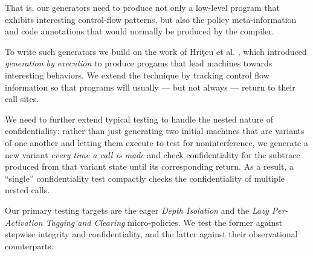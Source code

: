 \documentclass[10pt,conference]{ieeetran}%
\theoremstyle{definition}
\begin{document}
{That is, our generators need to produce not only a low-level program
that exhibits interesting control-flow patterns, but also the policy
meta-information and code annotations that would normally be produced
by the compiler.

To write such generators we build on the work of
Hri\c{t}cu et al. \cite{TestingNI:ICFP, DBLP:journals/jfp/HritcuLSADHPV16}, which
introduced {\em generation by execution} to produce progams that lead
machines towards interesting behaviors. We extend the technique by tracking
control flow information so that programs will usually --- but not always ---
return to their call sites.

%
%
%
We need to further extend typical testing to handle the nested
nature of confidentiality: rather than just generating two
initial machines that are variants of one another and letting them
execute to test for noninterference, we generate a new variant
{\em every time a call is made} and check confidentiality for the
subtrace produced from that variant state until its corresponding
return. As a result, a ``single'' confidentiality test compactly
checks the confidentiality of multiple nested calls.

Our primary testing targets are the eager {\em Depth Isolation}
and the {\em Lazy Per-Activation Tagging and Clearing} micro-policies.
We test the former against stepwise integrity and confidentiality, and
the latter against their observational counterparts.

}
\end{document}
